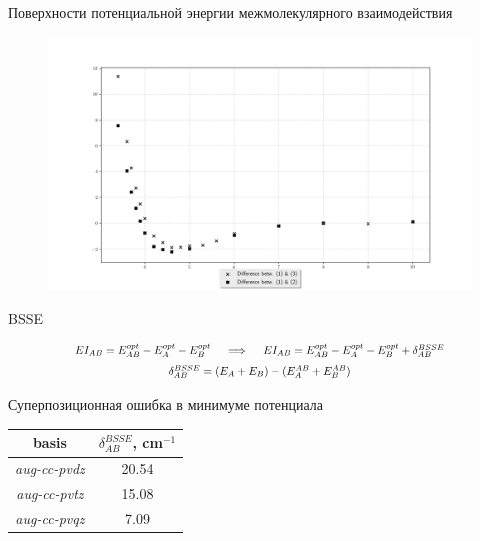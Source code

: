 \documentclass[hyperref={pdfpagelabel=false},usepdftitle=false,xcolor=dvipsnames]{beamer}
\begin{document}
\begin{frame}{\normalsize Поверхности потенциальной энергии межмолекулярного взаимодействия }
\begin{figure}
\vspace*{-0.3cm}
\includegraphics[width = \linewidth]{pictures/ppdiff.png}
\end{figure}
\end{frame}

\begin{frame}{\normalsize BSSE}
\begin{block}{}
\begin{gather}
\scalebox{0.8}{$EI_{AB} = E_{AB}^{opt} - E_{A}^{opt} - E_{B}^{opt} \quad \implies \quad EI_{AB} = E_{AB}^{opt} - E_{A}^{opt} - E_{B}^{opt} + \delta^{BSSE}_{AB}$} \notag \\
\scalebox{0.8}{$\delta^{BSSE}_{AB} = (E_A + E_B) - (E_A^{AB} + E_B^{AB})$} \notag
\end{gather}
\end{block}

\begin{block}{Суперпозиционная ошибка в минимуме потенциала}
\begin{center}
\begin{tabular}{cc}
\toprule
basis & $\delta^{BSSE}_{AB}$, cm$^{-1}$ \\
\midrule
\textit{aug-cc-pvdz} & 20.54 \\
\textit{aug-cc-pvtz} & 15.08 \\
\textit{aug-cc-pvqz} & 7.09 \\
\bottomrule
\end{tabular}
\end{center}
\end{block}
\end{frame}
\end{document}
